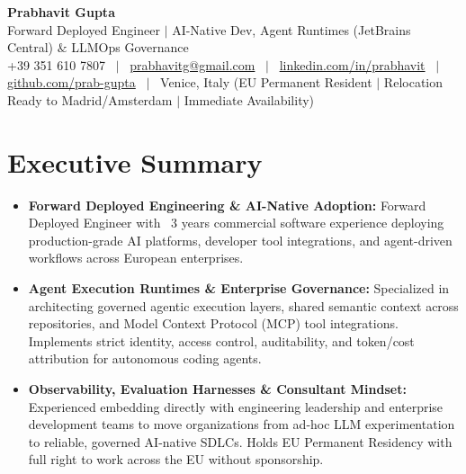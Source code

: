 \documentclass[a4paper,10pt]{article}
\begin{document}
\begin{minipage}[c]{0.80\textwidth}
  {\Huge\bfseries Prabhavit Gupta}\\[3pt]
  {\color{accent}\large Forward Deployed Engineer $\vert$ AI-Native Dev, Agent Runtimes (JetBrains Central) $\&$ LLMOps Governance}\\[6pt]
  {\footnotesize +39 351 610 7807 ~$\vert$~
  \href{mailto:prabhavitg@gmail.com}{prabhavitg@gmail.com} ~$\vert$~
  \href{https://www.linkedin.com/in/prabhavit/}{linkedin.com/in/prabhavit} ~$\vert$~
  \href{https://github.com/prab-gupta}{github.com/prab-gupta} ~$\vert$~
  Venice, Italy (EU Permanent Resident $\vert$ Relocation Ready to Madrid/Amsterdam $\vert$ Immediate Availability)}
\end{minipage}\hfill

\vspace{6pt}

\section{Executive Summary}
\begin{itemize}
  \item \textbf{Forward Deployed Engineering \& AI-Native Adoption:} Forward Deployed Engineer with ~3 years commercial software experience deploying production-grade AI platforms, developer tool integrations, and agent-driven workflows across European enterprises.
  \item \textbf{Agent Execution Runtimes \& Enterprise Governance:} Specialized in architecting governed agentic execution layers, shared semantic context across repositories, and Model Context Protocol (MCP) tool integrations. Implements strict identity, access control, auditability, and token/cost attribution for autonomous coding agents.
  \item \textbf{Observability, Evaluation Harnesses \& Consultant Mindset:} Experienced embedding directly with engineering leadership and enterprise development teams to move organizations from ad-hoc LLM experimentation to reliable, governed AI-native SDLCs. Holds EU Permanent Residency with full right to work across the EU without sponsorship.
\end{itemize}

\end{document}
